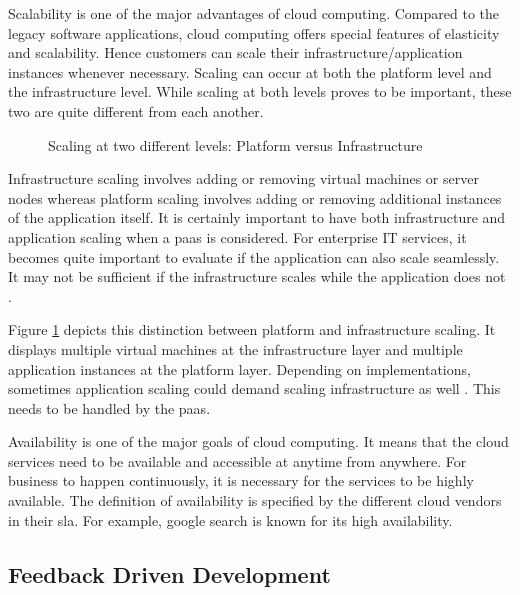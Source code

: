 \documentclass[article,type=msc,colorback,12pt,accentcolor=tud8b,table]{tudthesis}
\begin{document}
		Scalability is one of the major advantages of cloud computing. Compared to the legacy software applications, cloud computing offers special features of elasticity and scalability. Hence customers can scale their infrastructure/application instances whenever necessary. Scaling can occur at both the platform level and the infrastructure level. While scaling at both levels proves to be important, these two are quite different from each another. 
		
		\begin{figure}[!h]
			\begin{center}
			\end{center}
			\caption{Scaling at two different levels: Platform versus Infrastructure}
			\label{fig:scaling_infra_platform}
		\end{figure}
		
		Infrastructure scaling involves adding or removing virtual machines or server nodes whereas platform scaling involves adding or removing additional instances of the application itself. It is certainly important to have both infrastructure and application scaling when a \gls{paas} is considered. For enterprise IT services, it becomes quite important to evaluate if the application can also scale seamlessly. It may not be sufficient if the infrastructure scales while the application does not \cite{app_infra_scale}. 
		
		Figure \ref{fig:scaling_infra_platform} depicts this distinction between platform and infrastructure scaling. It displays multiple virtual machines at the infrastructure layer and multiple application instances at the platform layer. Depending on implementations, sometimes application scaling could demand scaling infrastructure as well \cite{cf_scale}. This needs to be handled by the \gls{paas}. 
		
		\par Availability is one of the major goals of cloud computing. It means that the cloud services need to be available and accessible at anytime from anywhere. For business to happen continuously, it is necessary for the services to be highly available. The definition of availability is specified by the different cloud vendors in their \gls{sla}. For example, google search is known for its high availability.	
		
		\subsection{Feedback Driven Development } 		
		
\end{document}
